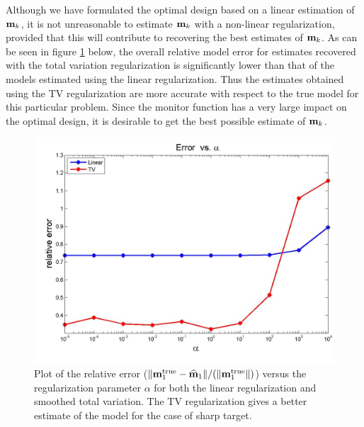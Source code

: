 \documentclass[11pt]{article}
\begin{document}
Although we have formulated the optimal design based on a linear estimation of ${\bf{m}}_k$, it is not unreasonable to estimate ${\bf{m}}_k$  with a non-linear regularization, provided that this will contribute to recovering the best estimates of ${\bf{m}}_k$. As can be seen in figure \ref{fig:erro1} below, the overall relative model error for estimates recovered with the total variation regularization is significantly lower than that of the models estimated using the linear regularization. Thus the estimates obtained using the TV regularization are more accurate with respect to the true model for this particular problem. 
Since the monitor function has a very large impact on the optimal design, it is desirable to get the best possible estimate of ${\bf{m}}_k$. 
%
\begin{figure}
\begin{center}
\iwidth=180mm
\includegraphics[width=.65\iwidth]{figures/newFigs/exp2-error1}
\end{center}
\caption{Plot of the relative error ($\|{\bf{m}}_1^{\rm true}-{\widehat{{\bf{m}}}}_1\|/(    \|{\bf{m}}^{\rm true}_1\|)$) versus the regularization parameter $\alpha$ for both the linear regularization and smoothed total variation. 
The TV regularization gives a better estimate of the model for the case of sharp target.
}
	\label{fig:erro1}
\end{figure} 

\end{document}
